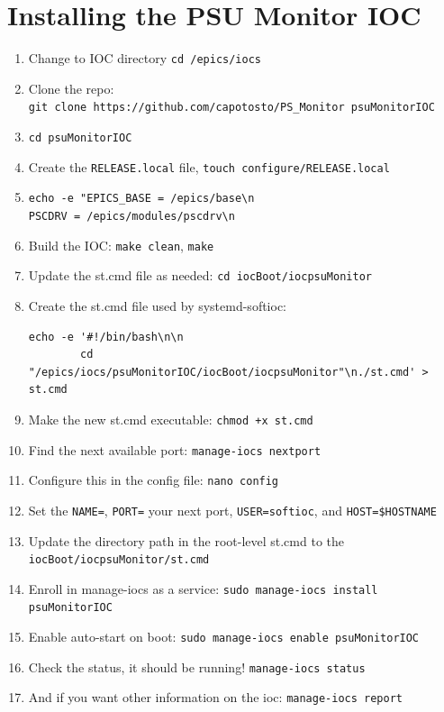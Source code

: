 \section{Installing the PSU Monitor IOC}
\begin{enumerate}
	\item Change to IOC directory \texttt{cd /epics/iocs}
	\item Clone the repo:\\
	\hspace*{1em} \texttt{git clone https://github.com/capotosto/PS\_Monitor psuMonitorIOC}
	\item \texttt{cd psuMonitorIOC}
	\item Create the \texttt{RELEASE.local} file, \texttt{touch configure/RELEASE.local}
	\item \texttt{echo -e "EPICS\_BASE = /epics/base\textbackslash n}\\
		\hspace*{2em}\texttt{PSCDRV = /epics/modules/pscdrv\textbackslash n}\\
	\item Build the IOC: \texttt{make clean}, \texttt{make}
	\item Update the st.cmd file as needed: \texttt{cd iocBoot/iocpsuMonitor}
	\item Create the st.cmd file used by systemd-softioc: \begin{verbatim}echo -e '#!/bin/bash\n\n
		cd "/epics/iocs/psuMonitorIOC/iocBoot/iocpsuMonitor"\n./st.cmd' > st.cmd\end{verbatim}
	\item Make the new st.cmd executable: \texttt{chmod +x st.cmd}
	\item Find the next available port: \texttt{manage-iocs nextport}
	\item Configure this in the config file: \texttt{nano config}
	\item Set the \texttt{NAME=}, \texttt{PORT=} your next port, \texttt{USER=softioc}, and \texttt{HOST=\$HOSTNAME}
	\item Update the directory path in the root-level st.cmd to the \texttt{iocBoot/iocpsuMonitor/st.cmd}
	\item Enroll in manage-iocs as a service: \texttt{sudo manage-iocs install psuMonitorIOC}
	\item Enable auto-start on boot: \texttt{sudo manage-iocs enable psuMonitorIOC}
	\item Check the status, it should be running! \texttt{manage-iocs status}
	\item And if you want other information on the ioc: \texttt{manage-iocs report}
\end{enumerate}




















